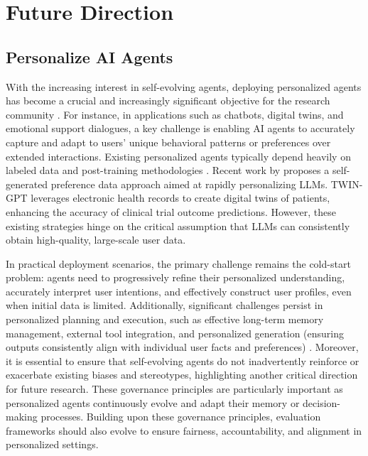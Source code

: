 \documentclass[10pt]{article} %
\begin{document}
\section{Future Direction}
\subsection{Personalize AI Agents}

With the increasing interest in self-evolving agents, deploying personalized agents has become a crucial and increasingly significant objective for the research community \citep{zhang2024personalization}. For instance, in applications such as chatbots, digital twins, and emotional support dialogues, a key challenge is enabling AI agents to accurately capture and adapt to users' unique behavioral patterns or preferences over extended interactions. Existing personalized agents typically depend heavily on labeled data and post-training methodologies \citep{cheng2024autopal}. Recent work by \cite{zhang2025personalize} proposes a self-generated preference data approach aimed at rapidly personalizing LLMs. TWIN-GPT \cite{wang2024twin} leverages electronic health records to create digital twins of patients, enhancing the accuracy of clinical trial outcome predictions. However, these existing strategies hinge on the critical assumption that LLMs can consistently obtain high-quality, large-scale user data.

In practical deployment scenarios, the primary challenge remains the cold-start problem: agents need to progressively refine their personalized understanding, accurately interpret user intentions, and effectively construct user profiles, even when initial data is limited. Additionally, significant challenges persist in personalized planning and execution, such as effective long-term memory management, external tool integration, and personalized generation (ensuring outputs consistently align with individual user facts and preferences) \citep{li2025survey}. Moreover, it is essential to ensure that self-evolving agents do not inadvertently reinforce or exacerbate existing biases and stereotypes, highlighting another critical direction for future research. 
These governance principles are particularly important as personalized agents continuously evolve and adapt their memory or decision-making processes. 
Building upon these governance principles, evaluation frameworks should also evolve to ensure fairness, accountability, and alignment in personalized settings.
\end{document}
